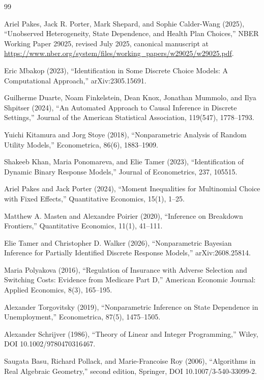 \documentclass{article}
\begin{document}
\begin{thebibliography}{99}

   Ariel Pakes, Jack R. Porter, Mark Shepard, and Sophie Calder-Wang (2025), ``Unobserved Heterogeneity, State Dependence, and Health Plan Choices,'' NBER Working Paper 29025, revised July 2025, canonical manuscript at \url{https://www.nber.org/system/files/working\_papers/w29025/w29025.pdf}.

   Eric Mbakop (2023), ``Identification in Some Discrete Choice Models: A Computational Approach,'' arXiv:2305.15691.

   Guilherme Duarte, Noam Finkelstein, Dean Knox, Jonathan Mummolo, and Ilya Shpitser (2024), ``An Automated Approach to Causal Inference in Discrete Settings,'' Journal of the American Statistical Association, 119(547), 1778--1793.

   Yuichi Kitamura and Jorg Stoye (2018), ``Nonparametric Analysis of Random Utility Models,'' Econometrica, 86(6), 1883--1909.

   Shakeeb Khan, Maria Ponomareva, and Elie Tamer (2023), ``Identification of Dynamic Binary Response Models,'' Journal of Econometrics, 237, 105515.

   Ariel Pakes and Jack Porter (2024), ``Moment Inequalities for Multinomial Choice with Fixed Effects,'' Quantitative Economics, 15(1), 1--25.

   Matthew A. Masten and Alexandre Poirier (2020), ``Inference on Breakdown Frontiers,'' Quantitative Economics, 11(1), 41--111.

   Elie Tamer and Christopher D. Walker (2026), ``Nonparametric Bayesian Inference for Partially Identified Discrete Response Models,'' arXiv:2608.25814.

   Maria Polyakova (2016), ``Regulation of Insurance with Adverse Selection and Switching Costs: Evidence from Medicare Part D,'' American Economic Journal: Applied Economics, 8(3), 165--195.

   Alexander Torgovitsky (2019), ``Nonparametric Inference on State Dependence in Unemployment,'' Econometrica, 87(5), 1475--1505.

   Alexander Schrijver (1986), ``Theory of Linear and Integer Programming,'' Wiley, DOI 10.1002/9780470316467.

   Saugata Basu, Richard Pollack, and Marie-Francoise Roy (2006), ``Algorithms in Real Algebraic Geometry,'' second edition, Springer, DOI 10.1007/3-540-33099-2.

\end{thebibliography}
\end{document}
